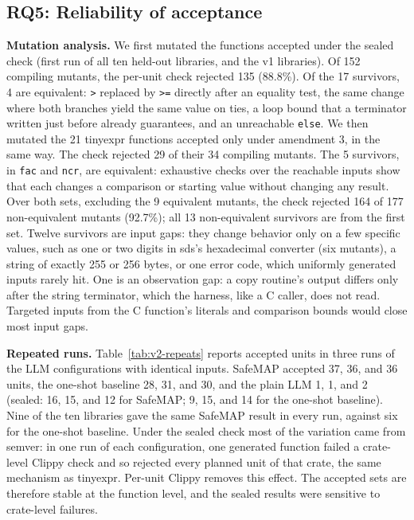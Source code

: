 \documentclass[pdflatex,sn-basic]{sn-jnl}
\newcommand{\tool}{SafeMAP\xspace}
\begin{document}


\subsection{RQ5: Reliability of acceptance}
\label{sec:rq5}

\textbf{Mutation analysis.} We first mutated the functions accepted under the
sealed check (first run of all ten held-out libraries, and the v1 libraries).
Of 152 compiling mutants, the per-unit check rejected 135 (88.8\%). Of the 17
survivors, 4 are equivalent: \texttt{>} replaced by \texttt{>=} directly
after an equality test, the same change where both branches yield the same
value on ties, a loop bound that a terminator written just before already
guarantees, and an unreachable \texttt{else}. We then mutated the 21 tinyexpr
functions accepted only under amendment 3, in the same way. The check rejected
29 of their 34 compiling mutants. The 5 survivors, in \texttt{fac} and
\texttt{ncr}, are equivalent: exhaustive checks over the reachable inputs show
that each changes a comparison or starting value without changing any result.
Over both sets, excluding the 9 equivalent mutants, the check rejected 164 of
177 non-equivalent mutants (92.7\%); all 13 non-equivalent survivors are
from the first set.
Twelve survivors are input gaps: they change
behavior only on a few specific values, such as one or two digits in sds's
hexadecimal converter (six mutants), a string of exactly 255 or 256 bytes, or one
error code, which uniformly generated inputs rarely hit. One is an observation
gap: a copy routine's output differs only after the string terminator, which
the harness, like a C caller, does not read. Targeted inputs from the C
function's literals and comparison bounds would close most input gaps.

\textbf{Repeated runs.} Table~\ref{tab:v2-repeats} reports accepted units in
three runs of the LLM configurations with identical inputs. \tool accepted 37,
36, and 36 units, the one-shot baseline 28, 31, and 30, and the plain LLM 1, 1,
and 2 (sealed: 16, 15, and 12 for \tool; 9, 15, and 14 for the one-shot
baseline). Nine of the ten libraries gave the same \tool result in every run,
against six for the one-shot baseline. Under the sealed check most of the
variation came from semver: in one run of each configuration, one generated
function failed a crate-level Clippy check and so rejected every planned unit
of that crate, the same mechanism as tinyexpr. Per-unit Clippy removes this
effect. The accepted sets are therefore stable at the function level, and the
sealed results were sensitive to crate-level failures.
\end{document}
